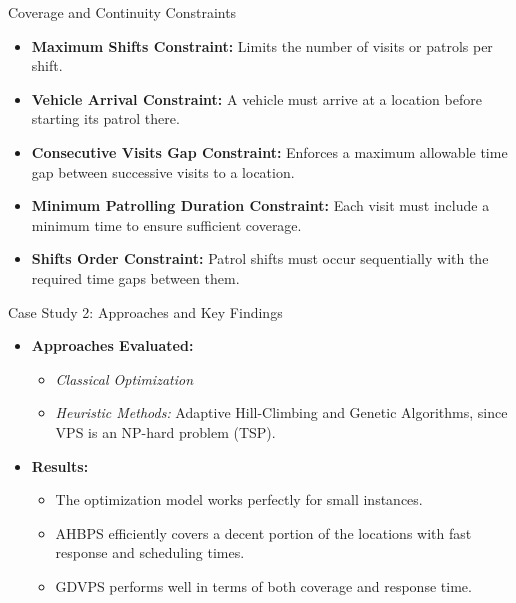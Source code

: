 \documentclass{beamer}
\begin{document}
\begin{frame}{Coverage and Continuity Constraints}
  \begin{itemize}
    \item \textbf{Maximum Shifts Constraint:} Limits the number of visits or patrols per shift.
    \pause
    \item \textbf{Vehicle Arrival Constraint:} A vehicle must arrive at a location before starting its patrol there.
    \pause
    \item \textbf{Consecutive Visits Gap Constraint:} Enforces a maximum allowable time gap between successive visits to a location.
    \pause
    \item \textbf{Minimum Patrolling Duration Constraint:} Each visit must include a minimum time to ensure sufficient coverage.
    \pause
    \item \textbf{Shifts Order Constraint:} Patrol shifts must occur sequentially with the required time gaps between them.
  \end{itemize}
\end{frame}

\begin{frame}{Case Study 2: Approaches and Key Findings}
  \begin{itemize}[<+->]
    \item \textbf{Approaches Evaluated:}
      \begin{itemize}[<+->]
        \item \emph{Classical Optimization}
        \item \emph{Heuristic Methods:} Adaptive Hill-Climbing and Genetic Algorithms, since VPS is an NP-hard problem (TSP).
      \end{itemize}
    \item \textbf{Results:}
      \begin{itemize}[<+->]
        \item The optimization model works perfectly for small instances.
        \item AHBPS efficiently covers a decent portion of the locations with fast response and scheduling times.
        \item GDVPS performs well in terms of both coverage and response time.
      \end{itemize}
  \end{itemize}
\end{frame}
\end{document}
